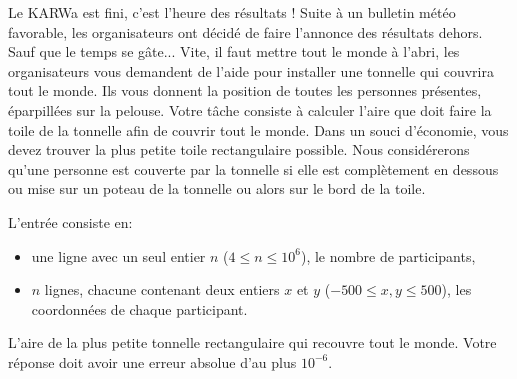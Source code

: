 \problemname{\problemyamlname}


\newcommand{\maxn}{10^6}

Le KARWa est fini, c'est l'heure des résultats ! Suite à un bulletin météo favorable, les organisateurs ont décidé de faire l'annonce des résultats dehors. Sauf que le temps se gâte... Vite, il faut mettre tout le monde à l'abri, les organisateurs vous demandent de l'aide pour installer une tonnelle qui couvrira tout le monde.
Ils vous donnent la position de toutes les personnes présentes, éparpillées sur la pelouse. Votre tâche consiste à calculer l'aire que doit faire la toile de la tonnelle afin de couvrir tout le monde. Dans un souci d'économie, vous devez trouver la plus petite toile rectangulaire possible.
Nous considérerons qu'une personne est couverte par la tonnelle si elle est complètement en dessous ou mise sur un poteau de la tonnelle ou alors sur le bord de la toile.

\begin{Input}
  L'entrée consiste en:
  \begin{itemize}
    \item une ligne avec un seul entier \(n\) (\(4 \leq n \leq \maxn\)), le nombre de participants,
    \item \(n\) lignes, chacune contenant deux entiers \(x\) et \(y\) (\(-500 \leq x, y \leq 500\)), les coordonnées de chaque participant.
  \end{itemize}
\end{Input}

\begin{Output}
  L'aire de la plus petite tonnelle rectangulaire qui recouvre tout le monde.
  Votre réponse doit avoir une erreur absolue d'au plus $10^{-6}$.
\end{Output}
